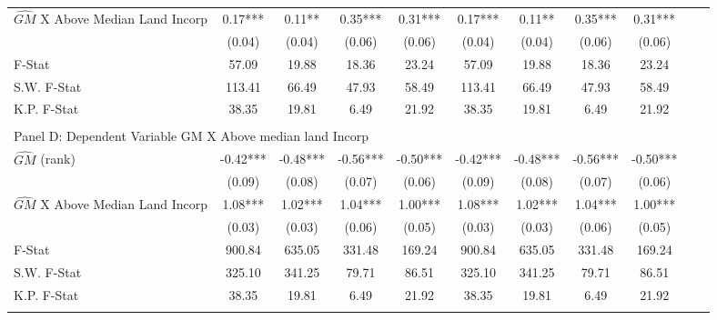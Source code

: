 \begin{table}[htbp]
\begin{threeparttable}
\begin{tabular}{l*{10}{c}}
\addlinespace
$\hat{GM}$ X Above Median Land Incorp&       0.17***&       0.11** &       0.35***&       0.31***&       0.17***&       0.11** &       0.35***&       0.31***\\
                &     (0.04)   &     (0.04)   &     (0.06)   &     (0.06)   &     (0.04)   &     (0.04)   &     (0.06)   &     (0.06)   \\
\midrule
F-Stat          &      57.09   &      19.88   &      18.36   &      23.24   &      57.09   &      19.88   &      18.36   &      23.24   \\
S.W. F-Stat     &     113.41   &      66.49   &      47.93   &      58.49   &     113.41   &      66.49   &      47.93   &      58.49   \\
K.P. F-Stat     &      38.35   &      19.81   &       6.49   &      21.92   &      38.35   &      19.81   &       6.49   &      21.92   \\
\cmidrule[\heavyrulewidth](lr){1-9} \\ \cmidrule[\heavyrulewidth](lr){1-9}
\multicolumn{8}{l}{Panel D: Dependent Variable GM X Above median land Incorp}\\
\cmidrule(lr){1-9}
$\hat{GM}$ (rank)&      -0.42***&      -0.48***&      -0.56***&      -0.50***&      -0.42***&      -0.48***&      -0.56***&      -0.50***\\
                &     (0.09)   &     (0.08)   &     (0.07)   &     (0.06)   &     (0.09)   &     (0.08)   &     (0.07)   &     (0.06)   \\
\addlinespace
$\hat{GM}$ X Above Median Land Incorp&       1.08***&       1.02***&       1.04***&       1.00***&       1.08***&       1.02***&       1.04***&       1.00***\\
                &     (0.03)   &     (0.03)   &     (0.06)   &     (0.05)   &     (0.03)   &     (0.03)   &     (0.06)   &     (0.05)   \\
\midrule
F-Stat          &     900.84   &     635.05   &     331.48   &     169.24   &     900.84   &     635.05   &     331.48   &     169.24   \\
S.W. F-Stat     &     325.10   &     341.25   &      79.71   &      86.51   &     325.10   &     341.25   &      79.71   &      86.51   \\
K.P. F-Stat     &      38.35   &      19.81   &       6.49   &      21.92   &      38.35   &      19.81   &       6.49   &      21.92   \\
\cmidrule[\heavyrulewidth](lr){1-9} \\ \cmidrule[\heavyrulewidth](lr){1-9}

\end{tabular}
\end{threeparttable}
\end{table}
